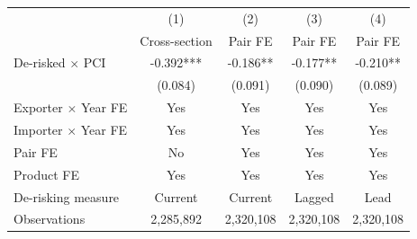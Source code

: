 \begin{tabular}{lcccc}
\toprule
 & (1) & (2) & (3) & (4) \\
 & Cross-section & Pair FE & Pair FE & Pair FE \\
\midrule
De-risked $\times$ PCI & -0.392*** & -0.186** & -0.177** & -0.210** \\
 & (0.084) & (0.091) & (0.090) & (0.089) \\
\midrule
Exporter $\times$ Year FE & Yes & Yes & Yes & Yes \\
Importer $\times$ Year FE & Yes & Yes & Yes & Yes \\
Pair FE & No & Yes & Yes & Yes \\
Product FE & Yes & Yes & Yes & Yes \\
De-risking measure & Current & Current & Lagged & Lead \\
Observations & 2,285,892 & 2,320,108 & 2,320,108 & 2,320,108 \\
\bottomrule
\end{tabular}